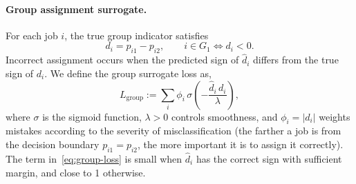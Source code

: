 \documentclass{article}
\begin{document}
\paragraph{Group assignment surrogate.}
For each job $i$, the true group indicator satisfies
\[
d_i = p_{i1} - p_{i2},
\qquad
i \in G_1 \iff d_i < 0.
\]
Incorrect assignment occurs when the predicted sign of $\hat{d}_i$ differs from the
true sign of $d_i$.
We define the group surrogate loss as,
\begin{equation}
L_{\mathrm{group}}
:= 
\sum_{i} 
\phi_i \,
\sigma\!\left( -\frac{\hat{d}_i\, d_i}{\lambda} \right),
\label{eq:group-loss}
\end{equation}
where $\sigma$ is the sigmoid function, $\lambda>0$ controls smoothness, and
$\phi_i = |d_i|$ weights mistakes according to the severity of misclassification
(the farther a job is from the decision boundary $p_{i1} = p_{i2}$, the more 
important it is to assign it correctly).
The term in~\eqref{eq:group-loss} is
small when $\hat{d}_i$ has the correct sign with sufficient margin, and close to
1 otherwise.
\end{document}
